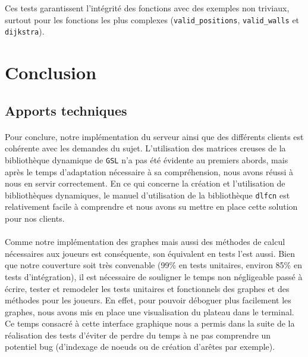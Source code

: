 \documentclass[a4paper]{article}
\begin{document}
Ces tests garantissent l'intégrité des fonctions avec des exemples non triviaux, surtout pour les fonctions les plus complexes (\texttt{valid\_positions}, \texttt{valid\_walls} et \texttt{dijkstra}).

\clearpage
\section{Conclusion}

\subsection{Apports techniques}
\paragraph{}
Pour conclure, notre implémentation du serveur ainsi que des différents clients est cohérente avec les demandes du sujet. L'utilisation des matrices creuses de la bibliothèque dynamique de \texttt{GSL} n'a pas été évidente au premiers abords, mais après le temps d'adaptation nécessaire à sa compréhension, nous avons réussi à nous en servir correctement. En ce qui concerne la création et l'utilisation de bibliothèques dynamiques, le manuel d'utilisation de la bibliothèque \texttt{dlfcn} est relativement facile à comprendre et nous avons su mettre en place cette solution pour nos clients.

\paragraph{}
Comme notre implémentation des graphes mais aussi des méthodes de calcul nécessaires aux joueurs est conséquente, son équivalent en tests l'est aussi. Bien que notre couverture soit très convenable (99\% en tests unitaires, environ 85\% en tests d'intégration), il est nécessaire de souligner le temps non négligeable passé à écrire, tester et remodeler les tests unitaires et fonctionnels des graphes et des méthodes pour les joueurs. En effet, pour pouvoir déboguer plus facilement les graphes, nous avons mis en place une visualisation du plateau dans le terminal. Ce temps consacré à cette interface graphique nous a permis dans la suite de la réalisation des tests d'éviter de perdre du temps à ne pas comprendre un potentiel bug (d'indexage de noeuds ou de création d'arêtes par exemple).
\end{document}
